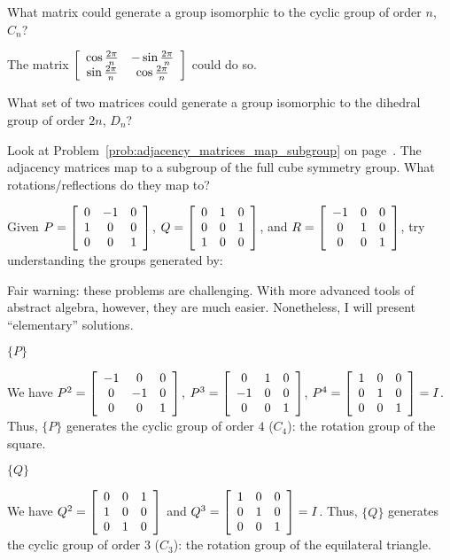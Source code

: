 \documentclass[../key.tex]{subfiles}
\begin{document}
\begin{outer_problem}
\item What matrix could generate a group isomorphic to the cyclic group of order $n$, $C_n$?
\end{outer_problem}

The matrix $\left[\begin{array}{cc} \cos \frac{2\pi}{n} & -\sin \frac{2\pi}{n} \\ \sin \frac{2\pi}{n} & \cos \frac{2\pi}{n} \end{array}\right]$ could do so.

\begin{outer_problem}
\item What set of two matrices could generate a group isomorphic to the dihedral group of order $2n$, $D_n$?
\end{outer_problem}

\begin{outer_problem}
\item Look at Problem~\ref{prob:adjacency_matrices_map_subgroup} on page~\pageref{prob:adjacency_matrices_map_subgroup}. The adjacency matrices map to a subgroup of the full cube symmetry group. What rotations/reflections do they map to?
\end{outer_problem}

\begin{outer_problem}
\item Given $P=\left[\begin{array}{ccc} 0 & -1 & 0 \\ 1 & 0 & 0 \\ 0 & 0 & 1 \end{array}\right]$, $Q=\left[\begin{array}{ccc} 0 & 1 & 0 \\ 0 & 0 & 1 \\ 1 & 0 & 0 \end{array}\right]$, and $R=\left[\begin{array}{ccc} -1 & 0 & 0 \\ 0 & 1 & 0 \\ 0 & 0 & 1 \end{array}\right]$, try understanding the groups generated by:
\end{outer_problem}

Fair warning: these problems are challenging. With more advanced tools of abstract algebra, however, they are much easier. Nonetheless, I will present ``elementary'' solutions.

\begin{inner_problem}[start=1]
\item $\{P\}$
\end{inner_problem}

We have $P^2 = \left[\begin{array}{ccc} -1 & 0 & 0 \\ 0 & -1 & 0 \\ 0 & 0 & 1 \end{array}\right]$, $P^3 = \left[\begin{array}{ccc} 0 & 1 & 0 \\ -1 & 0 & 0 \\ 0 & 0 & 1 \end{array}\right]$, $P^4 = \left[\begin{array}{ccc} 1 & 0 & 0 \\ 0 & 1 & 0 \\ 0 & 0 & 1 \end{array}\right] = I$. Thus, $\{P\}$ generates the cyclic group of order $4$ ($C_4$): the rotation group of the square.

\begin{inner_problem}
\item $\{Q\}$
\end{inner_problem}

We have $Q^2 = \left[\begin{array}{ccc} 0 & 0 & 1 \\ 1 & 0 & 0 \\ 0 & 1 & 0 \end{array}\right]$ and $Q^3 = \left[\begin{array}{ccc} 1 & 0 & 0 \\ 0 & 1 & 0 \\ 0 & 0 & 1 \end{array}\right]=I$. Thus, $\{Q\}$ generates the cyclic group of order $3$ ($C_3$): the rotation group of the equilateral triangle.
\end{document}

